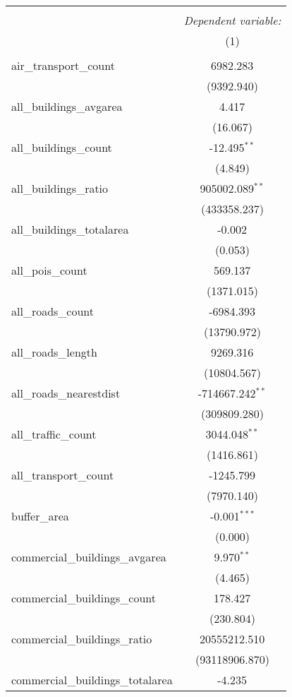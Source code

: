 \begin{table}[!htbp] \centering
\begin{tabular}{@{\extracolsep{5pt}}lc}
\\[-1.8ex]\hline
\hline \\[-1.8ex]
& \multicolumn{1}{c}{\textit{Dependent variable:}} \
\cr \cline{1-2}
\\[-1.8ex] & (1) \\
\hline \\[-1.8ex]
 air_transport_count & 6982.283$^{}$ \\
  & (9392.940) \\
 all_buildings_avgarea & 4.417$^{}$ \\
  & (16.067) \\
 all_buildings_count & -12.495$^{**}$ \\
  & (4.849) \\
 all_buildings_ratio & 905002.089$^{**}$ \\
  & (433358.237) \\
 all_buildings_totalarea & -0.002$^{}$ \\
  & (0.053) \\
 all_pois_count & 569.137$^{}$ \\
  & (1371.015) \\
 all_roads_count & -6984.393$^{}$ \\
  & (13790.972) \\
 all_roads_length & 9269.316$^{}$ \\
  & (10804.567) \\
 all_roads_nearestdist & -714667.242$^{**}$ \\
  & (309809.280) \\
 all_traffic_count & 3044.048$^{**}$ \\
  & (1416.861) \\
 all_transport_count & -1245.799$^{}$ \\
  & (7970.140) \\
 buffer_area & -0.001$^{***}$ \\
  & (0.000) \\
 commercial_buildings_avgarea & 9.970$^{**}$ \\
  & (4.465) \\
 commercial_buildings_count & 178.427$^{}$ \\
  & (230.804) \\
 commercial_buildings_ratio & 20555212.510$^{}$ \\
  & (93118906.870) \\
 commercial_buildings_totalarea & -4.235$^{}$ \\

\end{tabular}
\end{table}
